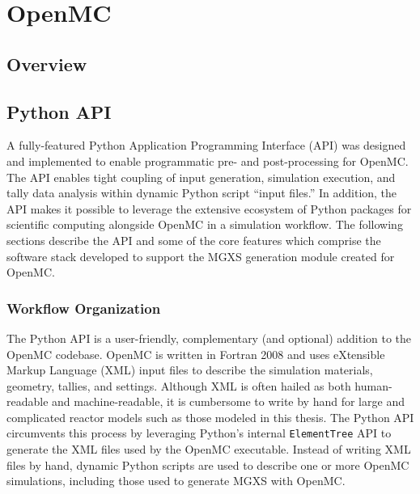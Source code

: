 \section{OpenMC}
\label{sec:openmc}


\subsection{Overview}
\label{subsec:openmc-overview}


\subsection{Python API}
\label{subsec:pyapi}

A fully-featured Python Application Programming Interface (API) was designed and implemented to enable programmatic pre- and post-processing for OpenMC\cite{boyd2016bigdata}. The API enables tight coupling of input generation, simulation execution, and tally data analysis within dynamic Python script ``input files.'' In addition, the API makes it possible to leverage the extensive ecosystem of Python packages for scientific computing alongside OpenMC in a simulation workflow. The following sections describe the API and some of the core features which comprise the software stack developed to support the MGXS generation module created for OpenMC.

\subsubsection{Workflow Organization}
\label{subsubsec:pyapi-workflow}

The Python API is a user-friendly, complementary (and optional) addition to the OpenMC codebase. OpenMC is written in Fortran 2008 and uses eXtensible Markup Language (XML) input files to describe the simulation materials, geometry, tallies, and settings. Although XML is often hailed as both human-readable and machine-readable, it is cumbersome to write by hand for large and complicated reactor models such as those modeled in this thesis. The Python API circumvents this process by leveraging Python's internal \texttt{ElementTree} API to generate the XML files used by the OpenMC executable. Instead of writing XML files by hand, dynamic Python scripts are used to describe one or more OpenMC simulations, including those used to generate MGXS with OpenMC.

